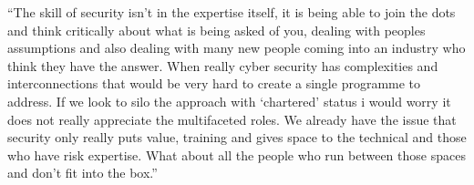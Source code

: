\documentclass[
  a4paper,
]{book}
\begin{document}
\begin{tcolorbox}[enhanced jigsaw, leftrule=.75mm, colframe=quarto-callout-note-color-frame, opacityback=0, breakable, left=2mm, rightrule=.15mm, bottomrule=.15mm, colback=white, arc=.35mm, toprule=.15mm]

``The skill of security isn't in the expertise itself, it is being able
to join the dots and think critically about what is being asked of you,
dealing with peoples assumptions and also dealing with many new people
coming into an industry who think they have the answer. When really
cyber security has complexities and interconnections that would be very
hard to create a single programme to address. If we look to silo the
approach with `chartered' status i would worry it does not really
appreciate the multifaceted roles. We already have the issue that
security only really puts value, training and gives space to the
technical and those who have risk expertise. What about all the people
who run between those spaces and don't fit into the box.''

\end{tcolorbox}
\end{document}
